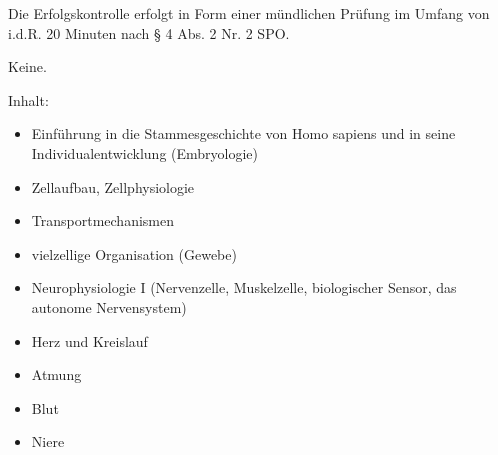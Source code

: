 \begin{course}

\setdoclanguagegerman
{}



\coursehead


\label{cour_8139.dp_997}


\begin{styleenv}
\begin{assessment}
Die Erfolgskontrolle erfolgt in Form einer mündlichen Prüfung im Umfang von i.d.R. 20 Minuten nach § 4 Abs. 2 Nr. 2 SPO.


\end{assessment}

\begin{conditions}Keine.\end{conditions}


\end{styleenv}

\begin{learningoutcomes}

\end{learningoutcomes}

\begin{content}
Inhalt:

 \begin{itemize}\item Einführung in die Stammesgeschichte von Homo sapiens und in seine Individualentwicklung (Embryologie)  \item  Zellaufbau, Zellphysiologie  \item Transportmechanismen  \item vielzellige Organisation (Gewebe)  \item Neurophysiologie I (Nervenzelle, Muskelzelle, biologischer Sensor, das autonome Nervensystem)  \item Herz und Kreislauf  \item Atmung  \item Blut  \item Niere  \end{itemize}
\end{content}







\end{course}